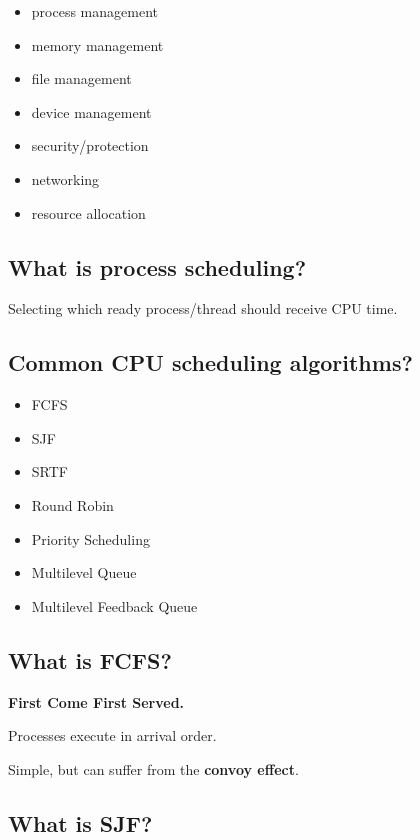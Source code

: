 \begin{itemize}
  \item process management
  \item memory management
  \item file management
  \item device management
  \item security/protection
  \item networking
  \item resource allocation
\end{itemize}

\medskip

\subsection{What is process scheduling?}

Selecting which ready process/thread should receive CPU time.

\medskip

\subsection{Common CPU scheduling algorithms?}

\begin{itemize}
  \item FCFS
  \item SJF
  \item SRTF
  \item Round Robin
  \item Priority Scheduling
  \item Multilevel Queue
  \item Multilevel Feedback Queue
\end{itemize}

\medskip

\subsection{What is FCFS?}

\textbf{First Come First Served.}

Processes execute in arrival order.

Simple, but can suffer from the \textbf{convoy effect}.

\medskip

\subsection{What is SJF?}

